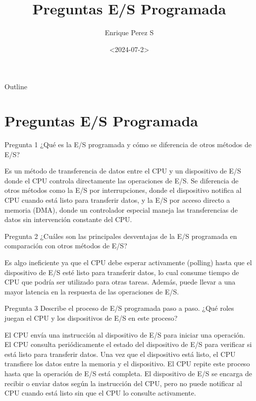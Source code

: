 \documentclass[presentation]{beamer}
\author{Enrique Perez S}
\date{<2024-07-2>}
\title{Preguntas E/S Programada}
\begin{document}
\maketitle
\begin{frame}{Outline}
\tableofcontents
\end{frame}


\section{Preguntas E/S Programada}
\label{sec:org787eb8d}
\begin{frame}[label={sec:org654cabf}]{Pregunta 1}
¿Qué es la E/S programada y cómo se diferencia de otros métodos de E/S?


Es un método de transferencia de datos entre el CPU y un dispositivo de E/S donde el CPU controla directamente las operaciones de E/S. Se diferencia de otros métodos como la E/S por interrupciones, donde el dispositivo notifica al CPU cuando está listo para transferir datos, y la E/S por acceso directo a memoria (DMA), donde un controlador especial maneja las transferencias de datos sin intervención constante del CPU.
\end{frame}

\begin{frame}[label={sec:org25e6a15}]{Pregunta 2}
¿Cuáles son las principales desventajas de la E/S programada en comparación con otros métodos de E/S?


Es algo ineficiente ya que el CPU debe esperar activamente (polling) hasta que el dispositivo de E/S esté listo para transferir datos, lo cual consume tiempo de CPU que podría ser utilizado para otras tareas. Además, puede llevar a una mayor latencia en la respuesta de las operaciones de E/S.
\end{frame}

\begin{frame}[label={sec:orgd53f750}]{Pregunta 3}
Describe el proceso de E/S programada paso a paso. ¿Qué roles juegan el CPU y los dispositivos de E/S en este proceso?


El CPU envía una instrucción al dispositivo de E/S para iniciar una operación.
El CPU consulta periódicamente el estado del dispositivo de E/S para verificar si está listo para transferir datos.
Una vez que el dispositivo está listo, el CPU transfiere los datos entre la memoria y el dispositivo.
El CPU repite este proceso hasta que la operación de E/S está completa.
El dispositivo de E/S se encarga de recibir o enviar datos según la instrucción del CPU, pero no puede notificar al CPU cuando está listo sin que el CPU lo consulte activamente.
\end{frame}
\end{document}
